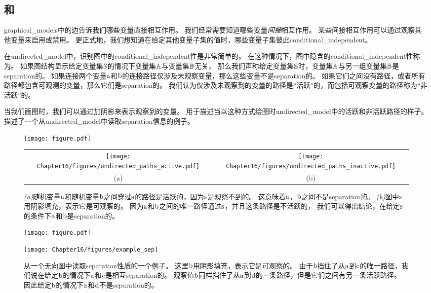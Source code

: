 \subsection{和}
\label{sec:separation_and_d_separation}

\gls{graphical_models}中的边告诉我们哪些变量直接相互作用。
我们经常需要知道哪些变量\emph{间接}相互作用。 
某些间接相互作用可以通过观察其他变量来启用或禁用。
更正式地，我们想知道在给定其他变量子集的值时，哪些变量子集彼此\gls{conditional_independent}。


在\gls{undirected_model}中，识别图中的\gls{conditional_independent}性是非常简单的。 
在这种情况下，图中隐含的\gls{conditional_independent}性称为。
如果图结构显示给定变量集$\mathbb{S}$的情况下变量集$\mathbb{A}$与变量集$\mathbb{B}$无关，
那么我们声称给定变量集$\mathbb{S}$时，变量集$\mathbb{A}$与另一组变量集$\mathbb{B}$是\gls{separation}的。
如果连接两个变量$\mathrm{a}$和$\mathrm{b}$的连接路径仅涉及未观察变量，那么这些变量不是\gls{separation}的。
如果它们之间没有路径，或者所有路径都包含可观测的变量，那么它们是\gls{separation}的。
我们认为仅涉及未观察到的变量的路径是``活跃''的，而包括可观察变量的路径称为``非活跃''的。


当我们画图时，我们可以通过加阴影来表示观察到的变量。
用于描述当以这种方式绘图时\gls{undirected_model}中的活跃和非活跃路径的样子。
描述了一个从\gls{undirected_model}中读取\gls{separation}信息的例子。


\begin{figure}[!htb]
\ifOpenSource
\centerline{\texttt{[image: figure.pdf]}}
\else
\centering
\begin{tabular}{cc}
\texttt{[image: Chapter16/figures/undirected\_paths\_active.pdf]} &%
\texttt{[image: Chapter16/figures/undirected\_paths\_inactive.pdf]} \\
(a) & (b)
\end{tabular}
\fi
\caption{\emph{(a)}随机变量$\mathrm{a}$和随机变量$\mathrm{b}$之间穿过$\mathrm{s}$的路径是活跃的，因为$\mathrm{s}$是观察不到的。
这意味着$\mathrm{a}$，$\mathrm{b}$之间不是\gls{separation}的。
\emph{(b)}图中$\mathrm{s}$用阴影填充，表示它是可观察的。
因为$\mathrm{a}$和$\mathrm{b}$之间的唯一路径通过$\mathrm{s}$，并且这条路径是不活跃的，
我们可以得出结论，在给定$\mathrm{s}$的条件下$\mathrm{a}$和$\mathrm{b}$是\gls{separation}的。}
\label{fig:undirected_paths_active}
\end{figure}

\begin{figure}[!htb]
\ifOpenSource
\centerline{\texttt{[image: figure.pdf]}}
\else
	\centerline{\texttt{[image: Chapter16/figures/example\_sep]}}
\fi
\caption{从一个无向图中读取\gls{separation}性质的一个例子。
这里$\mathrm{b}$用阴影填充，表示它是可观察的。
由于$\mathrm{b}$挡住了从$\mathrm{a}$到$\mathrm{c}$的唯一路径，我们说在给定$\mathrm{b}$的情况下$\mathrm{a}$和$\mathrm{c}$是相互\gls{separation}的。
观察值$\mathrm{b}$同样挡住了从$\mathrm{a}$到$\mathrm{d}$的一条路径，但是它们之间有另一条活跃路径。
因此给定$\mathrm{b}$的情况下$\mathrm{a}$和$\mathrm{d}$不是\gls{separation}的。}
	\label{fig:example_sep}
\end{figure}



